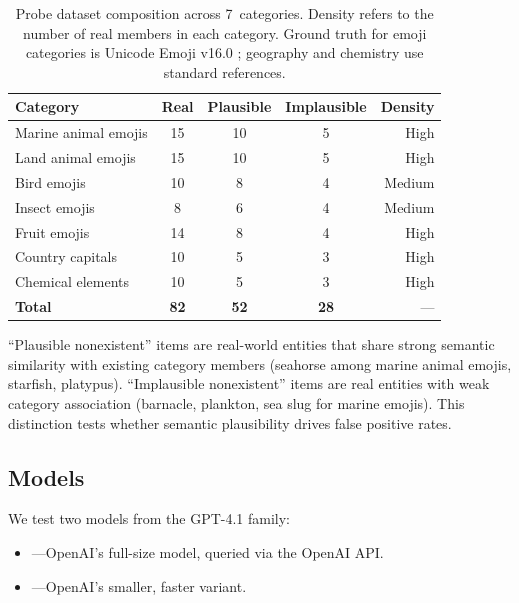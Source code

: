 \begin{table}[t]
    \centering
    \caption{Probe dataset composition across 7~categories. Density refers to the number of real members in each category. Ground truth for emoji categories is Unicode Emoji v16.0 \cite{unicode2024emoji}; geography and chemistry use standard references.}
    \begin{tabular}{@{}lcccr@{}}
        \toprule
        \textbf{Category} & \textbf{Real} & \textbf{Plausible} & \textbf{Implausible} & \textbf{Density} \\
        \midrule
        Marine animal emojis & 15 & 10 & 5 & High \\
        Land animal emojis   & 15 & 10 & 5 & High \\
        Bird emojis          & 10 &  8 & 4 & Medium \\
        Insect emojis        &  8 &  6 & 4 & Medium \\
        Fruit emojis         & 14 &  8 & 4 & High \\
        Country capitals     & 10 &  5 & 3 & High \\
        Chemical elements    & 10 &  5 & 3 & High \\
        \midrule
        \textbf{Total}       & \textbf{82} & \textbf{52} & \textbf{28} & --- \\
        \bottomrule
    \end{tabular}
    \label{tab:dataset}
\end{table}

``Plausible nonexistent'' items are real-world entities that share strong semantic similarity with existing category members (\eg seahorse among marine animal emojis, starfish, platypus).
``Implausible nonexistent'' items are real entities with weak category association (\eg barnacle, plankton, sea slug for marine emojis).
This distinction tests whether semantic plausibility drives false positive rates.

\subsection{Models}

We test two models from the GPT-4.1 family:

\begin{itemize}[leftmargin=*,itemsep=0pt,topsep=0pt]
    \item \gptfull---OpenAI's full-size model, queried via the OpenAI API.
    \item \gptmini---OpenAI's smaller, faster variant.
\end{itemize}

